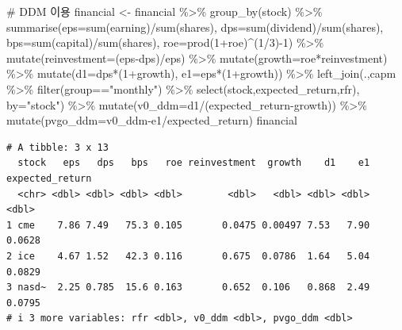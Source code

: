 \documentclass[
  letterpaper,
  DIV=11,
  numbers=noendperiod]{scrreprt}
\newenvironment{Shaded}{\begin{snugshade}}{\end{snugshade}}
\newcommand{\AttributeTok}[1]{\textcolor[rgb]{0.40,0.45,0.13}{#1}}
\newcommand{\CommentTok}[1]{\textcolor[rgb]{0.37,0.37,0.37}{#1}}
\newcommand{\DecValTok}[1]{\textcolor[rgb]{0.68,0.00,0.00}{#1}}
\newcommand{\FunctionTok}[1]{\textcolor[rgb]{0.28,0.35,0.67}{#1}}
\newcommand{\NormalTok}[1]{\textcolor[rgb]{0.00,0.23,0.31}{#1}}
\newcommand{\OtherTok}[1]{\textcolor[rgb]{0.00,0.23,0.31}{#1}}
\newcommand{\SpecialCharTok}[1]{\textcolor[rgb]{0.37,0.37,0.37}{#1}}
\newcommand{\StringTok}[1]{\textcolor[rgb]{0.13,0.47,0.30}{#1}}
\begin{document}
\begin{Shaded}
\begin{Highlighting}[]
\CommentTok{\# DDM 이용}
\NormalTok{financial }\OtherTok{\textless{}{-}}\NormalTok{ financial }\SpecialCharTok{\%\textgreater{}\%} 
  \FunctionTok{group\_by}\NormalTok{(stock) }\SpecialCharTok{\%\textgreater{}\%} 
  \FunctionTok{summarise}\NormalTok{(}\AttributeTok{eps=}\FunctionTok{sum}\NormalTok{(earning)}\SpecialCharTok{/}\FunctionTok{sum}\NormalTok{(shares),}
            \AttributeTok{dps=}\FunctionTok{sum}\NormalTok{(dividend)}\SpecialCharTok{/}\FunctionTok{sum}\NormalTok{(shares),}
            \AttributeTok{bps=}\FunctionTok{sum}\NormalTok{(capital)}\SpecialCharTok{/}\FunctionTok{sum}\NormalTok{(shares),}
            \AttributeTok{roe=}\FunctionTok{prod}\NormalTok{(}\DecValTok{1}\SpecialCharTok{+}\NormalTok{roe)}\SpecialCharTok{\^{}}\NormalTok{(}\DecValTok{1}\SpecialCharTok{/}\DecValTok{3}\NormalTok{)}\SpecialCharTok{{-}}\DecValTok{1}\NormalTok{) }\SpecialCharTok{\%\textgreater{}\%} 
  \FunctionTok{mutate}\NormalTok{(}\AttributeTok{reinvestment=}\NormalTok{(eps}\SpecialCharTok{{-}}\NormalTok{dps)}\SpecialCharTok{/}\NormalTok{eps) }\SpecialCharTok{\%\textgreater{}\%} 
  \FunctionTok{mutate}\NormalTok{(}\AttributeTok{growth=}\NormalTok{roe}\SpecialCharTok{*}\NormalTok{reinvestment) }\SpecialCharTok{\%\textgreater{}\%} 
  \FunctionTok{mutate}\NormalTok{(}\AttributeTok{d1=}\NormalTok{dps}\SpecialCharTok{*}\NormalTok{(}\DecValTok{1}\SpecialCharTok{+}\NormalTok{growth),}
         \AttributeTok{e1=}\NormalTok{eps}\SpecialCharTok{*}\NormalTok{(}\DecValTok{1}\SpecialCharTok{+}\NormalTok{growth)) }\SpecialCharTok{\%\textgreater{}\%} 
  \FunctionTok{left\_join}\NormalTok{(.,capm }\SpecialCharTok{\%\textgreater{}\%} \FunctionTok{filter}\NormalTok{(group}\SpecialCharTok{==}\StringTok{"monthly"}\NormalTok{) }\SpecialCharTok{\%\textgreater{}\%} \FunctionTok{select}\NormalTok{(stock,expected\_return,rfr),}
            \AttributeTok{by=}\StringTok{"stock"}\NormalTok{) }\SpecialCharTok{\%\textgreater{}\%} 
  \FunctionTok{mutate}\NormalTok{(}\AttributeTok{v0\_ddm=}\NormalTok{d1}\SpecialCharTok{/}\NormalTok{(expected\_return}\SpecialCharTok{{-}}\NormalTok{growth)) }\SpecialCharTok{\%\textgreater{}\%} 
  \FunctionTok{mutate}\NormalTok{(}\AttributeTok{pvgo\_ddm=}\NormalTok{v0\_ddm}\SpecialCharTok{{-}}\NormalTok{e1}\SpecialCharTok{/}\NormalTok{expected\_return)}
\NormalTok{financial}
\end{Highlighting}
\end{Shaded}

\begin{verbatim}
# A tibble: 3 x 13
  stock   eps   dps   bps   roe reinvestment  growth    d1    e1 expected_return
  <chr> <dbl> <dbl> <dbl> <dbl>        <dbl>   <dbl> <dbl> <dbl>           <dbl>
1 cme    7.86 7.49   75.3 0.105       0.0475 0.00497 7.53   7.90          0.0628
2 ice    4.67 1.52   42.3 0.116       0.675  0.0786  1.64   5.04          0.0829
3 nasd~  2.25 0.785  15.6 0.163       0.652  0.106   0.868  2.49          0.0795
# i 3 more variables: rfr <dbl>, v0_ddm <dbl>, pvgo_ddm <dbl>
\end{verbatim}
\end{document}

